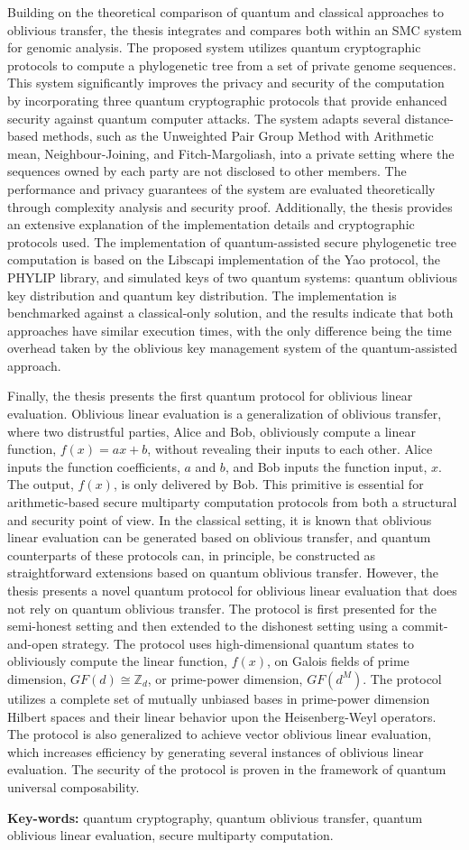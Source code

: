 Building on the theoretical comparison of quantum and classical approaches to oblivious transfer, the thesis integrates and compares both within an SMC system for genomic analysis. The proposed system utilizes quantum cryptographic protocols to compute a phylogenetic tree from a set of private genome sequences. This system significantly improves the privacy and security of the computation by incorporating three quantum cryptographic protocols that provide enhanced security against quantum computer attacks. The system adapts several distance-based methods, such as the Unweighted Pair Group Method with Arithmetic mean, Neighbour-Joining, and Fitch-Margoliash, into a private setting where the sequences owned by each party are not disclosed to other members. The performance and privacy guarantees of the system are evaluated theoretically through complexity analysis and security proof. Additionally, the thesis provides an extensive explanation of the implementation details and cryptographic protocols used. The implementation of quantum-assisted secure phylogenetic tree computation is based on the Libscapi implementation of the Yao protocol, the PHYLIP library, and simulated keys of two quantum systems: quantum oblivious key distribution and quantum key distribution. The implementation is benchmarked against a classical-only solution, and the results indicate that both approaches have similar execution times, with the only difference being the time overhead taken by the oblivious key management system of the quantum-assisted approach.

Finally, the thesis presents the first quantum protocol for oblivious linear evaluation. Oblivious linear evaluation is a generalization of oblivious transfer, where two distrustful parties, Alice and Bob, obliviously compute a linear function, $f(x) = ax + b$, without revealing their inputs to each other. Alice inputs the function coefficients, $a$ and $b$, and Bob inputs the function input, $x$. The output, $f(x)$, is only delivered by Bob. This primitive is essential for arithmetic-based secure multiparty computation protocols from both a structural and security point of view. In the classical setting, it is known that oblivious linear evaluation can be generated based on oblivious transfer, and quantum counterparts of these protocols can, in principle, be constructed as straightforward extensions based on quantum oblivious transfer. However, the thesis presents a novel quantum protocol for oblivious linear evaluation that does not rely on quantum oblivious transfer. The protocol is first presented for the semi-honest setting and then extended to the dishonest setting using a commit-and-open strategy. The protocol uses high-dimensional quantum states to obliviously compute the linear function, $f(x)$, on Galois fields of prime dimension, $GF(d) \cong \mathbb{Z}_d$, or prime-power dimension, $GF(d^M)$. The protocol utilizes a complete set of mutually unbiased bases in prime-power dimension Hilbert spaces and their linear behavior upon the Heisenberg-Weyl operators. The protocol is also generalized to achieve vector oblivious linear evaluation, which increases efficiency by generating several instances of oblivious linear evaluation. The security of the protocol is proven in the framework of quantum universal composability.

\vfill

\begin{flushleft}
\textbf{Key-words:} quantum cryptography, quantum oblivious transfer, quantum oblivious linear evaluation, secure multiparty computation.
\end{flushleft}
